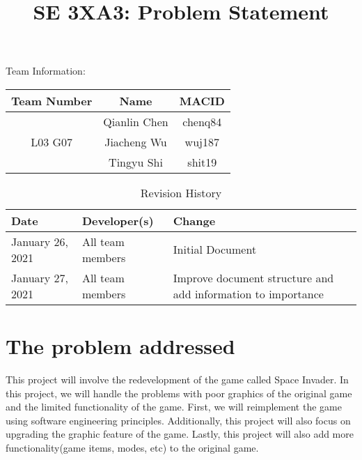 \documentclass[12pt]{article}
\title{SE 3XA3: Problem Statement}
\begin{document}
\maketitle

{\Large Team Information:}
\begin{table}[htp]
\centering
{\Large
\begin{tabular}{|c|c|c|}
\hline
\multicolumn{1}{|l|}{Team Number} & Name         & MACID   \\ \hline
\multirow{3}{*}{L03 G07}          & Qianlin Chen & chenq84 \\ \cline{2-3} 
                                  & Jiacheng Wu  & wuj187  \\ \cline{2-3} 
                                  & Tingyu Shi   & shit19  \\ \hline
\end{tabular}
}
\end{table}

\begin{table}[htp]
\caption{Revision History} 
\begin{tabularx}{\textwidth}{llX}
\toprule
\textbf{Date} & \textbf{Developer(s)} & \textbf{Change}\\
\midrule
January 26, 2021 & All team members & Initial Document\\
January 27, 2021 & All team members & Improve document structure and add information to importance\\
\bottomrule
\end{tabularx}
\end{table}

\newpage



\section{The problem addressed}
This project will involve the redevelopment of the game called Space Invader. In this project, we will handle the problems with poor graphics of the original game and the limited functionality of the game. First, we will reimplement the game using software engineering principles. Additionally, this project will also focus on upgrading the graphic feature of the game. Lastly, this project will also add more functionality(game items, modes, etc) to the original game.
\end{document}

